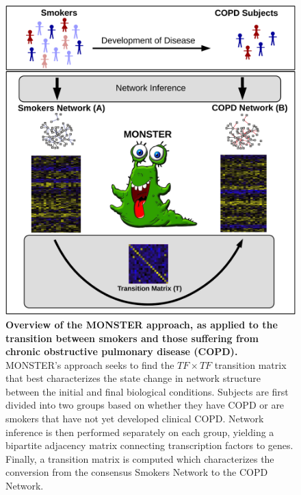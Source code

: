 \begin{figure}[h]
\includegraphics[width=1\columnwidth]{figures/figure1c}
\caption{\textbf{Overview of the MONSTER approach, as applied to the transition between smokers and those suffering from chronic obstructive pulmonary disease (COPD).} MONSTER's approach seeks to find the $TF\times TF$ transition matrix that best characterizes the state change in network structure between the initial and final biological conditions. Subjects are first divided into two groups based on whether they have COPD or are smokers that have not yet developed clinical COPD. Network inference is then performed separately on each group, yielding a bipartite adjacency matrix connecting transcription factors to genes. Finally, a transition matrix is computed which characterizes the conversion from the consensus Smokers Network to the COPD Network.}
\label{fig:overview}
\end{figure}

